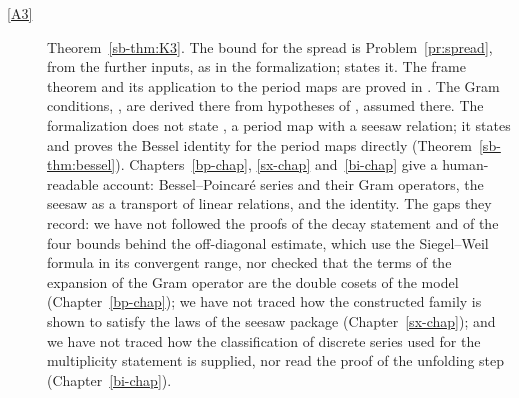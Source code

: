 \documentclass[reqno]{amsart}
\newcounter{chap}
\theoremstyle{definition}
\theoremstyle{plain}
\begin{document}
{\begin{description}
\item[\eqref{A3}] Theorem~\ref{sb-thm:K3}.  The bound for the spread is Problem~\ref{pr:spread}, from the further inputs, as in the formalization; \cite[Lemma~18.13]{Adr} states it.  The frame theorem and its application to the period maps are proved in \cite[Thms.~13.8 and~13.15]{Adr}.  The Gram conditions, \cite[Thms.~14.1--14.3]{Adr}, are derived there from hypotheses of \cite[\S14]{Adr}, assumed there.  The formalization does not state \cite[Hyp.~14.10]{Adr}, a period map with a seesaw relation; it states and proves the Bessel identity for the period maps directly (Theorem~\ref{sb-thm:bessel}).  Chapters~\ref{bp-chap}, \ref{sx-chap} and~\ref{bi-chap} give a human-readable account: Bessel--Poincar\'e series and their Gram operators, the seesaw as a transport of linear relations, and the identity.  The gaps they record: we have not followed the proofs of the decay statement and of the four bounds behind the off-diagonal estimate, which use the Siegel--Weil formula in its convergent range, nor checked that the terms of the expansion of the Gram operator are the double cosets of the model (Chapter~\ref{bp-chap}); we have not traced how the constructed family is shown to satisfy the laws of the seesaw package (Chapter~\ref{sx-chap}); and we have not traced how the classification of discrete series used for the multiplicity statement is supplied, nor read the proof of the unfolding step (Chapter~\ref{bi-chap}).

\end{description}}
\end{document}
